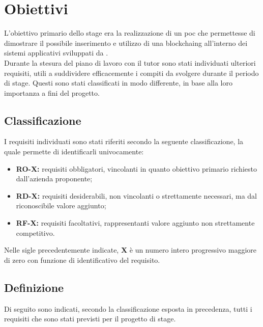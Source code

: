 \section{Obiettivi}

L'obiettivo primario dello stage era la realizzazione di un \gls{poc} che permettesse di dimostrare il possibile inserimento e utilizzo di una \gls{blockchaing} all'interno dei sistemi applicativi sviluppati da \myCompany{} \companyTitle.\\
Durante la stesura del piano di lavoro con il tutor \myTutor{} sono stati individuati ulteriori requisiti, utili a suddividere efficacemente i compiti da svolgere durante il periodo di stage. Questi sono stati classificati in modo differente, in base alla loro importanza a fini del progetto.

\subsection{Classificazione}
I requisiti individuati sono stati riferiti secondo la seguente classificazione, la quale permette di identificarli univocamente:
\begin{itemize}
	\item \textbf{RO-X:} requisiti obbligatori, vincolanti in quanto obiettivo primario richiesto dall'azienda proponente;
	\item \textbf{RD-X:} requisiti desiderabili, non vincolanti o strettamente necessari, ma dal riconoscibile valore aggiunto;
	\item \textbf{RF-X:} requisiti facoltativi, rappresentanti valore aggiunto non strettamente competitivo.
\end{itemize}
Nelle sigle precedentemente indicate, \textbf{X} è un numero intero progressivo maggiore di zero con funzione di identificativo del requisito.

\subsection{Definizione}
Di seguito sono indicati, secondo la classificazione esposta in precedenza, tutti i requisiti che sono stati previsti per il progetto di stage.

